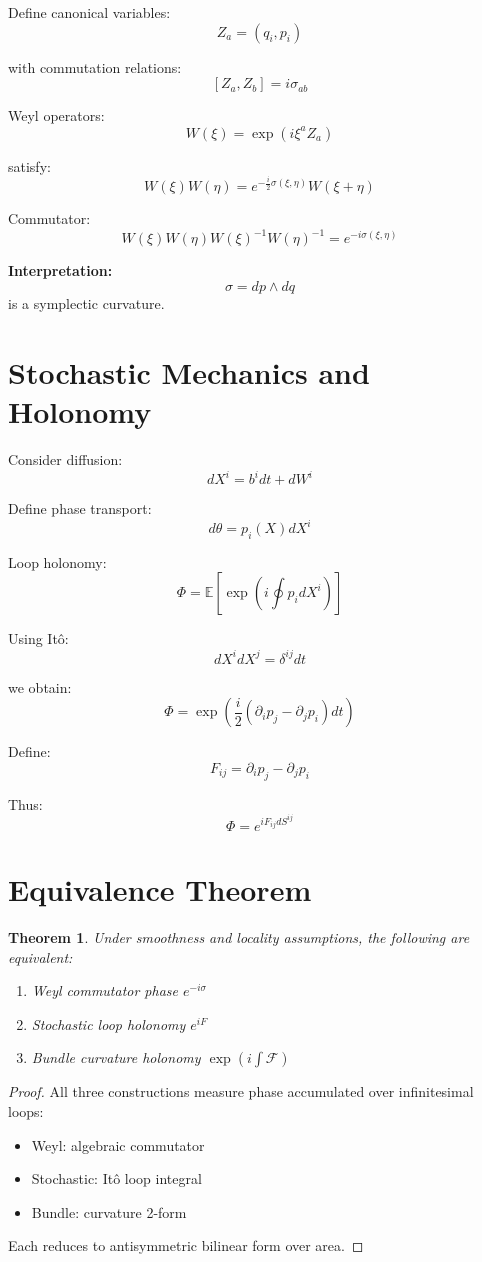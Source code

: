 \documentclass[11pt]{article}
\newtheorem{theorem}{Theorem}
\begin{document}
Define canonical variables:
\[
Z_a = (q_i, p_i)
\]

with commutation relations:
\[
[Z_a, Z_b] = i \sigma_{ab}
\]

Weyl operators:
\[
W(\xi) = \exp(i \xi^a Z_a)
\]

satisfy:
\[
W(\xi)W(\eta) = e^{-\frac{i}{2}\sigma(\xi,\eta)} W(\xi+\eta)
\]

Commutator:
\[
W(\xi)W(\eta)W(\xi)^{-1}W(\eta)^{-1}
= e^{-i\sigma(\xi,\eta)}
\]

\textbf{Interpretation:}
\[
\sigma = dp \wedge dq
\]
is a symplectic curvature.

\section{Stochastic Mechanics and Holonomy}

Consider diffusion:
\[
dX^i = b^i dt + dW^i
\]

Define phase transport:
\[
d\theta = p_i(X) dX^i
\]

Loop holonomy:
\[
\Phi = \mathbb{E}\left[\exp(i \oint p_i dX^i)\right]
\]

Using It\^o:
\[
dX^i dX^j = \delta^{ij} dt
\]

we obtain:
\[
\Phi = \exp\left( \frac{i}{2} (\partial_i p_j - \partial_j p_i) dt \right)
\]

Define:
\[
F_{ij} = \partial_i p_j - \partial_j p_i
\]

Thus:
\[
\Phi = e^{i F_{ij} dS^{ij}}
\]

\section{Equivalence Theorem}
\begin{theorem}
Under smoothness and locality assumptions, the following are equivalent:
\begin{enumerate}
\item Weyl commutator phase $e^{-i\sigma}$
\item Stochastic loop holonomy $e^{iF}$
\item Bundle curvature holonomy $\exp(i\int \mathcal{F})$
\end{enumerate}
\end{theorem}

\begin{proof}
All three constructions measure phase accumulated over infinitesimal loops:
\begin{itemize}
\item Weyl: algebraic commutator
\item Stochastic: It\^o loop integral
\item Bundle: curvature 2-form
\end{itemize}
Each reduces to antisymmetric bilinear form over area.
\end{proof}
\end{document}
